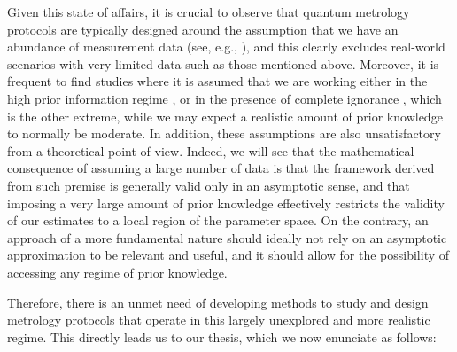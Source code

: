 Given this state of affairs, it is crucial to observe that quantum metrology protocols are typically designed around the assumption that we have an abundance of measurement data (see, e.g., \cite{braunstein_gaussian1992, rafal2015, braun2018, tsang2016, liu2016, lumino2017}), and this clearly excludes real-world scenarios with very limited data such as those mentioned above. Moreover, it is frequent to find studies where it is assumed that we are working either in the high prior information regime \cite{paris2009, rafal2015}, or in the presence of complete ignorance \cite{ariano1998, chiara2003, chiribella2005, holevo2011, rafal2015}, which is the other extreme, while we may expect a realistic amount of prior knowledge to normally be moderate. In addition, these assumptions are also unsatisfactory from a theoretical point of view. Indeed, we will see that the mathematical consequence of assuming a large number of data is that the framework derived from such premise is generally valid only in an asymptotic sense, and that imposing a very large amount of prior knowledge effectively restricts the validity of our estimates to a local region of the parameter space. On the contrary, an approach of a more fundamental nature should ideally not rely on an asymptotic approximation to be relevant and useful, and it should allow for the possibility of accessing any regime of prior knowledge. 

Therefore, there is an unmet need of developing methods to study and design metrology protocols that operate in this largely unexplored and more realistic regime. This directly leads us to our thesis, which we now enunciate as follows:
\begin{framed}
\end{framed}

